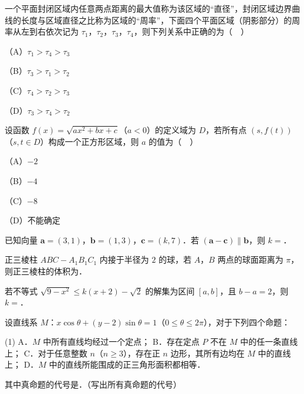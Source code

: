 \begingroup
\renewenvironment{question}{\Needspace{0.5\textheight}}{}
\begin{question}
一个平面封闭区域内任意两点距离的最大值称为该区域的“直径”，封闭区域边界曲线的长度与区域直径之比称为区域的“周率”，下面四个平面区域（阴影部分）的周率从左到右依次记为 $\tau_1$，$\tau_2$，$\tau_3$，$\tau_4$，则下列关系中正确的为（　）

（A）$\tau_1>\tau_4>\tau_3$

（B）$\tau_3>\tau_1>\tau_2$

（C）$\tau_4>\tau_2>\tau_3$

（D）$\tau_3>\tau_4>\tau_2$
\nopagebreak[4]
\begin{center}\end{center}
\nopagebreak[4]
\end{question}
\endgroup
\begin{question}
设函数 $f(x)=\sqrt{ax^2+bx+c}$（$a<0$）的定义域为 $D$，若所有点 $(s,f(t))$（$s,t\in D$）构成一个正方形区域，则 $a$ 的值为（　）

（A）$-2$

（B）$-4$

（C）$-8$

（D）不能确定

\end{question}

\begin{question}
已知向量 $\boldsymbol a=(3,1)$，$\boldsymbol b=(1,3)$，$\boldsymbol c=(k,7)$．若 $(\boldsymbol a-\boldsymbol c)\parallel\boldsymbol b$，则 $k=$\gkblank{}．

\end{question}
\begin{question}
正三棱柱 $ABC-A_1B_1C_1$ 内接于半径为 $2$ 的球，若 $A$，$B$ 两点的球面距离为 $\pi$，则正三棱柱的体积为\gkblank{}．

\end{question}
\begin{question}
若不等式 $\sqrt{9-x^2}\leqslant k(x+2)-\sqrt2$ 的解集为区间 $[a,b]$，且 $b-a=2$，则 $k=$\gkblank{}．

\end{question}
\begin{question}
设直线系 $M$：$x\cos\theta+(y-2)\sin\theta=1$（$0\leqslant\theta\leqslant2\pi$），对于下列四个命题：

\begin{gkopts}(1)
\task A．$M$ 中所有直线均经过一个定点；
\task B．存在定点 $P$ 不在 $M$ 中的任一条直线上；
\task C．对于任意整数 $n$（$n\geqslant3$），存在正 $n$ 边形，其所有边均在 $M$ 中的直线上；
\task D．$M$ 中的直线所能围成的正三角形面积都相等．
\end{gkopts}

其中真命题的代号是\gkblank{}．（写出所有真命题的代号）

\end{question}

